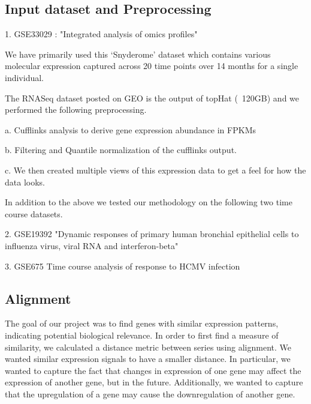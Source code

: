\documentclass[aps,prd,final,onecolumn,a4paper,10pt]{revtex4}
\begin{document}
\subsection{Input dataset and Preprocessing}
\begin{description}
 \item 1. GSE33029 : "Integrated analysis of omics profiles"
 
 We have primarily used this ‘Snyderome’ dataset which contains various molecular expression captured across 20 time points over 14 months for a single individual.

The RNASeq dataset posted on GEO is the output of topHat (~120GB) and we performed the following preprocessing.
\begin{description}
 \item a. Cufflinks analysis to derive gene expression abundance in FPKMs
 \item b. Filtering and Quantile normalization of the cufflinks output.
 \item c. We then created multiple views of this expression data to get a feel for how the
		data looks.
\end{description}


In addition to the above we tested our methodology on the following two time course datasets.

 \item 2. GSE19392 "Dynamic responses of primary human bronchial epithelial cells to influenza virus, viral RNA and interferon-beta"
 \item 3. GSE675 Time course analysis of response to HCMV infection
\end{description}


\subsection{Alignment}

The goal of our project was to find genes with similar expression patterns, indicating potential biological relevance.
In order to first find a measure of similarity, we calculated a distance metric between series using alignment.
We wanted similar expression signals to have a smaller distance. In particular, we wanted to capture the fact that changes in expression of one gene may affect the expression of another gene, but in the future. Additionally, we wanted to capture that the upregulation of a gene may cause the downregulation of another gene.
\\
\end{document}
